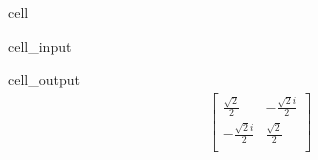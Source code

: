 \documentclass[letterpaper,10pt,english]{jupyterBook}
\begin{document}
\begin{sphinxuseclass}{cell}\begin{sphinxVerbatimInput}

\begin{sphinxuseclass}{cell_input}
\begin{sphinxVerbatim}[commandchars=\\\{\}]
 
\end{sphinxVerbatim}

\end{sphinxuseclass}\end{sphinxVerbatimInput}
\begin{sphinxVerbatimOutput}

\begin{sphinxuseclass}{cell_output}\begin{equation*}
\begin{split}\begin{bmatrix}
\frac{\sqrt{2}}{2} & - \frac{\sqrt{2} i}{2}  \\
 - \frac{\sqrt{2} i}{2} & \frac{\sqrt{2}}{2}  \\
 \end{bmatrix}
\end{split}
\end{equation*}
\end{sphinxuseclass}\end{sphinxVerbatimOutput}

\end{sphinxuseclass}
\end{document}
